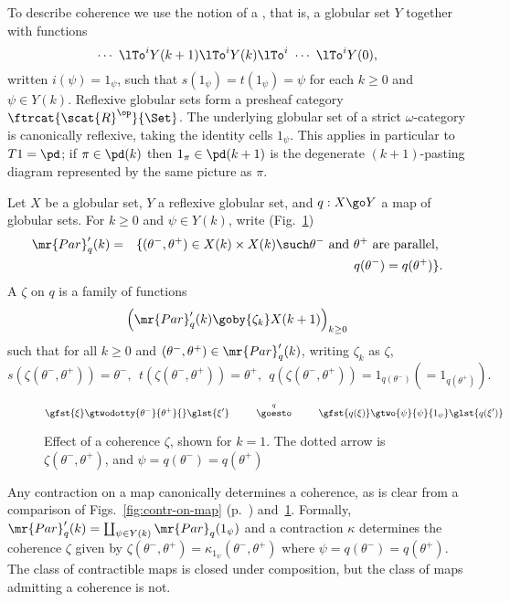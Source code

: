 To describe coherence we use the notion of a , that is, a globular set $Y$ together with functions
\[
\cdots \ 
\lTo^i	Y(k+1) 
\lTo^i	Y(k)
\lTo^i
\ \cdots \ 
\lTo^i	Y(0),
\]%
% 
%
% 
written $i(\psi) = 1_\psi$, such that $s(1_\psi) = t(1_\psi) = \psi$ for
each $k\geq 0$ and $\psi\in Y(k)$.  Reflexive globular sets form a presheaf
category $\ftrcat{\scat{R}^\op}{\Set}$.%
% 
% 
 The underlying globular set of a
strict $\omega$-category is canonically reflexive, taking the identity
cells $1_\psi$.  This applies in particular to $T1 = \pd$; if $\pi \in
\pd(k)$ then $1_\pi \in \pd(k+1)$ is the degenerate $(k+1)$-pasting
diagram represented by the same picture as $\pi$.
%
\begin{defn}
Let $X$ be a globular set, $Y$ a reflexive globular set, and $q: X \go Y$ a
map of globular sets.  For $k\geq 0$ and $\psi\in Y(k)$, write
(Fig.~\ref{fig:coh-on-map}) 
% 
\begin{eqnarray*}
\mr{Par}'_q(k)	&
=	&
\{ (\theta^-, \theta^+) \in X(k) \times X(k) \such	
\theta^- \textrm{ and } \theta^+ \textrm{ are parallel, }
\\  &	&
q(\theta^-) = q(\theta^+) \}.
\end{eqnarray*}
% 
A %
%
%
$\zeta$ on $q$ is a family of functions
\[
\left(
\mr{Par}'_q(k) \goby{\zeta_k} X(k+1)
\right)_{k\geq 0}
\]
such that for all $k\geq 0$ and $(\theta^-, \theta^+) \in \mr{Par}'_q(k)$,
writing $\zeta_k$ as $\zeta$,
\[
s(\zeta(\theta^-, \theta^+)) = \theta^-,
\ \ 
t(\zeta(\theta^-, \theta^+)) = \theta^+,
\ \ 
q(\zeta(\theta^-, \theta^+)) = 1_{q(\theta^-)} (= 1_{q(\theta^+)}).
\]
\end{defn}
% 
\begin{figure}
\[
\gfst{\xi}\gtwodotty{\theta^-}{\theta^+}{}%
\glst{\xi'}
\mbox{\hspace{2.5em}}
\stackrel{q}{\goesto}
\mbox{\hspace{2.5em}}
\gfst{q(\xi)}\gtwo{\psi}{\psi}{1_\psi}\glst{q(\xi')}
\]
\caption{Effect of a coherence $\zeta$, shown for $k=1$.  The dotted arrow
  is $\zeta(\theta^-, \theta^+)$, and $\psi = q(\theta^-) = q(\theta^+)$}
\label{fig:coh-on-map}
\end{figure}

\begin{example}
Any contraction on a map canonically determines a coherence, as is clear
from a comparison of Figs.~\ref{fig:contr-on-map}
(p.~\pageref{fig:contr-on-map}) and~\ref{fig:coh-on-map}.  Formally,
$\mr{Par}'_q(k) = \coprod_{\psi\in Y(k)} \mr{Par}_q(1_\psi)$ and a
contraction $\kappa$ determines the coherence $\zeta$ given by
$\zeta(\theta^-, \theta^+) = \kappa_{1_\psi}(\theta^-, \theta^+)$ where
$\psi = q(\theta^-) = q(\theta^+)$.  The class of contractible maps is
closed under composition, but the class of maps admitting a coherence is
not.
\end{example}

